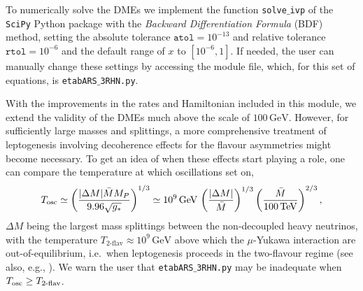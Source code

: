 \documentclass[12pt, a4paper]{article}
\begin{document}
To numerically solve the DMEs we implement the function \texttt{solve$\_$ivp} of the \texttt{SciPy} Python package \cite{Virtanen:2019joe} with the \textit{Backward Differentiation Formula} (BDF) method, setting the absolute tolerance $\texttt{atol} = 10^{-13}$ and relative tolerance $\texttt{rtol} = 10^{-6}$ and the default range of $x$ to $[10^{-6},1]$. If needed, the user can manually change these settings by accessing the module file, which, for this set of equations, is \texttt{etabARS$\_$3RHN.py}.

With the improvements in the rates and Hamiltonian included in this module, we extend the validity of the DMEs much above the scale of $100\,\text{GeV}$. However, for sufficiently large masses and splittings, a more comprehensive treatment of leptogenesis involving decoherence effects for the flavour asymmetries might become necessary. To get an idea of when these effects start playing a role, one can compare the temperature at which oscillations set on, 
\begin{equation}
     T_{\rm osc}\simeq \left(\frac{|\Delta M|\bar{M} M_P}{9.96 \sqrt{g_*}}\right)^{1/3} \simeq 10^{9}\,\text{GeV}\,\left(\frac{|\Delta M|}{\bar{M}}\right)^{1/3}\left(\frac{\bar{M}}{100\,{\rm TeV}}\right)^{2/3},
\end{equation} $\Delta M$ being the largest mass splittings between the non-decoupled heavy neutrinos, with the temperature $T_{\text{2-flav}}\approx 10^9\,\text{GeV}$ above which the $\mu$-Yukawa interaction are out-of-equilibrium, i.e.~when leptogenesis proceeds in the two-flavour regime \cite{Abada:2006ea} (see also, e.g., \cite{Granelli:2021fyc}). We warn the user that \texttt{etabARS$\_$3RHN.py} may be inadequate when $T_{\rm osc} \geq T_{\text{2-flav}}$.
\end{document}
